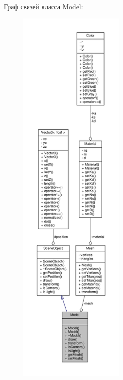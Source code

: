 Граф связей класса Model\+:
\nopagebreak
\begin{figure}[H]
\begin{center}
\leavevmode
\includegraphics[height=550pt]{d0/db1/class_model__coll__graph}
\end{center}
\end{figure}
